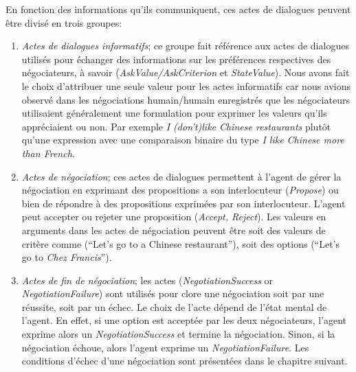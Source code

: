 		En fonction des informations qu'ils communiquent, ces actes de dialogues peuvent être divisé en trois groupes:
		
		\begin{enumerate}
			
			\item \textit{Actes de dialogues informatifs}; ce groupe fait référence aux actes de dialogues utilisés pour échanger des informations sur les préférences respectives des négociateurs, à savoir (\textit{AskValue/AskCriterion} et \textit{StateValue}). 
			Nous avons fait le choix d'attribuer une seule valeur pour les actes informatifs car nous avions observé dans les négociations humain/humain enregistrés que les négociateurs utilisaient généralement une formulation pour exprimer les valeurs qu'ils appréciaient ou non. Par exemple \textit{I (don't)like Chinese restaurants} plutôt qu'une expression avec une comparaison binaire du type \textit{I like Chinese more than French}.
			
			\item \textit{Actes de négociation}; ces actes de dialogues permettent à l'agent de gérer la négociation en exprimant des propositions a son interlocuteur (\textit{Propose}) ou bien de répondre à des propositions exprimées par son interlocuteur. L'agent peut accepter ou rejeter une proposition (\textit{Accept, Reject}). Les valeurs en arguments dans les actes de négociation peuvent être soit des valeurs de critère comme (``Let's go to a Chinese restaurant''), soit des options  (``Let's go to \emph{Chez Francis}''). 
			
			\item \textit{Actes de fin de négociation}; les actes  (\textit{NegotiationSuccess} or \textit{NegotiationFailure}) sont utilisés pour clore une négociation soit par une réussite, soit par un échec. Le choix de l'acte dépend de l'état mental de l'agent. En effet, si une option est acceptée par les deux négociateurs, l'agent exprime alors un \textit{NegotiationSuccess} et termine la négociation. Sinon, si la négociation échoue, alors l'agent exprime un \textit{NegotiationFailure}. Les conditions d'échec d'une négociation sont présentées dans le chapitre suivant. 
			
		\end{enumerate}
		 
